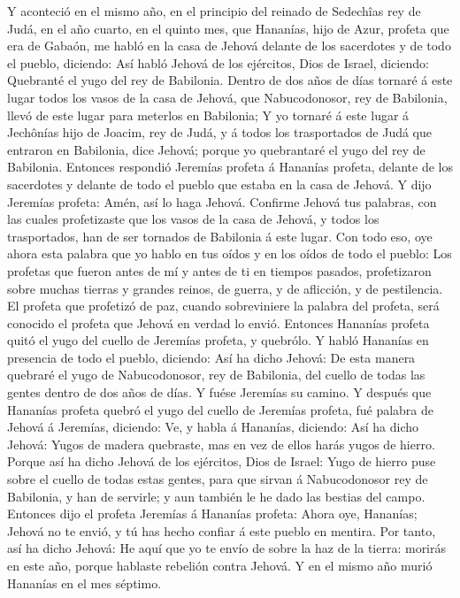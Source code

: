  Y aconteció en el mismo año, en el principio del reinado de
Sedechîas rey de Judá, en el año cuarto, en el quinto mes, que Hananías,
hijo de Azur, profeta que era de Gabaón, me habló en la casa de Jehová
delante de los sacerdotes y de todo el pueblo, diciendo: 
Así habló Jehová de los ejércitos, Dios de Israel, diciendo: Quebranté
el yugo del rey de Babilonia.  Dentro de dos años de días
tornaré á este lugar todos los vasos de la casa de Jehová, que
Nabucodonosor, rey de Babilonia, llevó de este lugar para meterlos en
Babilonia;  Y yo tornaré á este lugar á Jechônías hijo de
Joacim, rey de Judá, y á todos los trasportados de Judá que entraron en
Babilonia, dice Jehová; porque yo quebrantaré el yugo del rey de
Babilonia.  Entonces respondió Jeremías profeta á Hananías
profeta, delante de los sacerdotes y delante de todo el pueblo que
estaba en la casa de Jehová.  Y dijo Jeremías profeta: Amén,
así lo haga Jehová. Confirme Jehová tus palabras, con las cuales
profetizaste que los vasos de la casa de Jehová, y todos los
trasportados, han de ser tornados de Babilonia á este lugar.
 Con todo eso, oye ahora esta palabra que yo hablo en tus
oídos y en los oídos de todo el pueblo:  Los profetas que
fueron antes de mí y antes de ti en tiempos pasados, profetizaron sobre
muchas tierras y grandes reinos, de guerra, y de aflicción, y de
pestilencia.  El profeta que profetizó de paz, cuando
sobreviniere la palabra del profeta, será conocido el profeta que Jehová
en verdad lo envió.  Entonces Hananías profeta quitó el
yugo del cuello de Jeremías profeta, y quebrólo.  Y habló
Hananías en presencia de todo el pueblo, diciendo: Así ha dicho Jehová:
De esta manera quebraré el yugo de Nabucodonosor, rey de Babilonia, del
cuello de todas las gentes dentro de dos años de días. Y fuése Jeremías
su camino.  Y después que Hananías profeta quebró el yugo
del cuello de Jeremías profeta, fué palabra de Jehová á Jeremías,
diciendo:  Ve, y habla á Hananías, diciendo: Así ha dicho
Jehová: Yugos de madera quebraste, mas en vez de ellos harás yugos de
hierro.  Porque así ha dicho Jehová de los ejércitos, Dios
de Israel: Yugo de hierro puse sobre el cuello de todas estas gentes,
para que sirvan á Nabucodonosor rey de Babilonia, y han de servirle; y
aun también le he dado las bestias del campo.  Entonces
dijo el profeta Jeremías á Hananías profeta: Ahora oye, Hananías; Jehová
no te envió, y tú has hecho confiar á este pueblo en mentira.
 Por tanto, así ha dicho Jehová: He aquí que yo te envío de
sobre la haz de la tierra: morirás en este año, porque hablaste rebelión
contra Jehová.  Y en el mismo año murió Hananías en el mes
séptimo.

